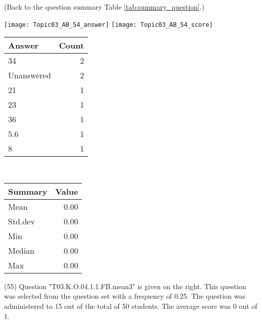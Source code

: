 \documentclass[12pt,english,nohyper]{tufte-handout}\usepackage[]{graphicx}\usepackage[]{color}
\begin{document}
 (Back to the question summary Table \ref{tab:summary_question}.)

\begin{center} \texttt{[image: Topic03\_AB\_54\_answer]} \texttt{[image: Topic03\_AB\_54\_score]} \end{center} 

\begin{center}%
\begin{tabular}{lr}
  \hline
Answer & Count \\ 
  \hline
34 &   2 \\ 
  Unanswered &   2 \\ 
  21 &   1 \\ 
  23 &   1 \\ 
  36 &   1 \\ 
  5.6 &   1 \\ 
  8 &   1 \\ 
   \hline
\end{tabular}
~~~~~~~~%
\begin{tabular}{lr}
  \hline
Summary & Value \\ 
  \hline
Mean & 0.00 \\ 
  Std.dev & 0.00 \\ 
  Min & 0.00 \\ 
  Median & 0.00 \\ 
  Max & 0.00 \\ 
   \hline
\end{tabular}
\end{center}\newpage{} (55) Question "T03.K.O.04.1.1.FB.mean3" is given on the right. This question was selected from the question set with a frequency of 0.25. The question was administered to 15 out of the total of 50 students. The average score was 0 out of 1.
\end{document}
